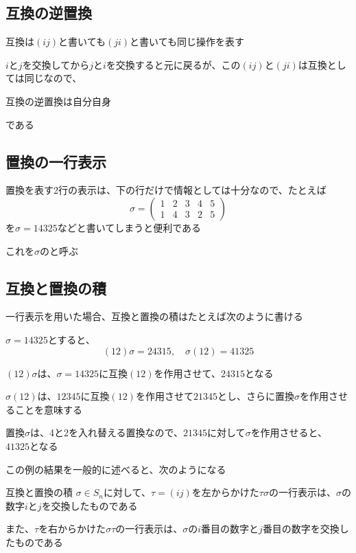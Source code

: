 \documentclass[../../../topic_linear-algebra]{subfiles}
\begin{document}
\subsection{互換の逆置換}

互換は$(ij)$と書いても$(ji)$と書いても同じ操作を表す

$i$と$j$を交換してから$j$と$i$を交換すると元に戻るが、この$(ij)$と$(ji)$は互換としては同じなので、
\begin{shaded}
  互換の逆置換は自分自身
\end{shaded}
である

\subsection{置換の一行表示}

置換を表す2行の表示は、下の行だけで情報としては十分なので、たとえば
\begin{equation*}
  \sigma = \begin{pmatrix}
    1 & 2 & 3 & 4 & 5 \\
    1 & 4 & 3 & 2 & 5
  \end{pmatrix}
\end{equation*}
を$\sigma = 14325$などと書いてしまうと便利である

これを$\sigma$のと呼ぶ

\subsection{互換と置換の積}

一行表示を用いた場合、互換と置換の積はたとえば次のように書ける

$\sigma = 14325$とすると、
\begin{equation*}
  (12)\sigma = 24315,\quad \sigma(12) = 41325
\end{equation*}

$(12)\sigma$は、$\sigma = 14325$に互換$(12)$を作用させて、$24315$となる

\br

$\sigma(12)$は、$12345$に互換$(12)$を作用させて$21345$とし、さらに置換$\sigma$を作用させることを意味する

置換$\sigma$は、4と2を入れ替える置換なので、$21345$に対して$\sigma$を作用させると、$41325$となる

\br

この例の結果を一般的に述べると、次のようになる

\begin{theorem}{互換と置換の積}
  $\sigma \in S_n$に対して、$\tau = (ij)$を左からかけた$\tau\sigma$の一行表示は、$\sigma$の数字$i$と$j$を交換したものである

  また、$\tau$を右からかけた$\sigma\tau$の一行表示は、$\sigma$の$i$番目の数字と$j$番目の数字を交換したものである
\end{theorem}
\end{document}
